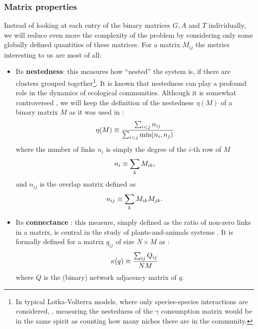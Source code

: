 \documentclass[12pt, titlepage]{report}
\begin{document}
\subsubsection{Matrix properties}
Instead of looking at each entry of the binary matrices $G, A$ and $T$ individually, we will reduce even more the complexity of the problem by considering only some globally defined quantities of these matrices. For a matrix $M_{ij}$ the metrics interesting to us are most of all:
\begin{itemize}
\item Its \textbf{nestedness}: this measures how ``nested'' the system is, \ie if there are clusters grouped together\footnote{In typical Lotka-Volterra models, where only species-species interactions are considered, \eg \cite{iannelli_introduction_2014}, measuring the nestedness of the $\gamma$ consumption matrix would be in the same spirit as counting how many niches there are in the community.}. It is known \cite{bastolla_architecture_2009, pascual-garcia_mutualism_2017} that nestedness can play a profound role in the dynamics of ecological communities. Although it is somewhat controversed \cite{jonhson_factors_2013}, we will keep the definition of the nestedness $\eta(M)$ of a binary matrix $M$ as it was used in \cite{bastolla_architecture_2009}:
\begin{equation}
\eta(M)\equiv \frac{\sum_{i<j} n_{ij}}{\sum_{i < j} \min(n_i, n_j)}
\end{equation}
where the number of links $n_i$ is simply the degree of the $i$-th row of $M$
\begin{equation}
n_i \equiv \sum_k M_{ik},
\end{equation}
and $n_{ij}$ is the overlap matrix defined as
\begin{equation}
n_{ij}\equiv \sum_k M_{ik}M_{jk}.
\end{equation}

\item Its \textbf{connectance} : this measure, simply defined as the ratio of non-zero links in a matrix, is central in the study of plants-and-animals systems \cite{pascual-garcia_mutualism_2017}. It is formally defined for a matrix $q_{ij}$  of size $N\times M$ as :
\begin{equation}
\kappa(q)\equiv \frac{\sum_{ij} Q_{ij}}{NM}
\end{equation}
where $Q$ is the (binary) network adjacency matrix of $q$.



\end{itemize}
\end{document}
